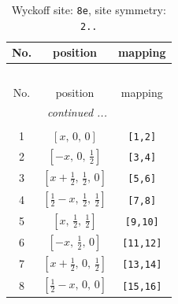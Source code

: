 \documentclass[fleqn,8pt]{jsarticle}
\begin{document}
\renewcommand{\arraystretch}{1.2}
\begin{longtable}{ccc}
\caption{Wyckoff site: {\tt 8e}, site symmetry: {\tt 2..}}
 \\
 \hline \hline
No. & position & mapping \\ \hline \endfirsthead

\multicolumn{2}{l}{\tablename\ \thetable{}} \\
 \hline \hline
No. & position & mapping \\ \hline \endhead

 \hline \hline
\multicolumn{2}{r}{\footnotesize\it continued ...} \\ \endfoot

 \hline \hline
\multicolumn{2}{r}{} \\ \endlastfoot

1 & $\left[ x,\, 0,\, 0 \right]$ & {\tt [1,2]} \\ \hline
2 & $\left[ - x,\, 0,\, \frac{1}{2} \right]$ & {\tt [3,4]} \\ \hline
3 & $\left[ x + \frac{1}{2},\, \frac{1}{2},\, 0 \right]$ & {\tt [5,6]} \\ \hline
4 & $\left[ \frac{1}{2} - x,\, \frac{1}{2},\, \frac{1}{2} \right]$ & {\tt [7,8]} \\ \hline
5 & $\left[ x,\, \frac{1}{2},\, \frac{1}{2} \right]$ & {\tt [9,10]} \\ \hline
6 & $\left[ - x,\, \frac{1}{2},\, 0 \right]$ & {\tt [11,12]} \\ \hline
7 & $\left[ x + \frac{1}{2},\, 0,\, \frac{1}{2} \right]$ & {\tt [13,14]} \\ \hline
8 & $\left[ \frac{1}{2} - x,\, 0,\, 0 \right]$ & {\tt [15,16]} \\
\end{longtable}
\renewcommand{\arraystretch}{1.2}
\end{document}
